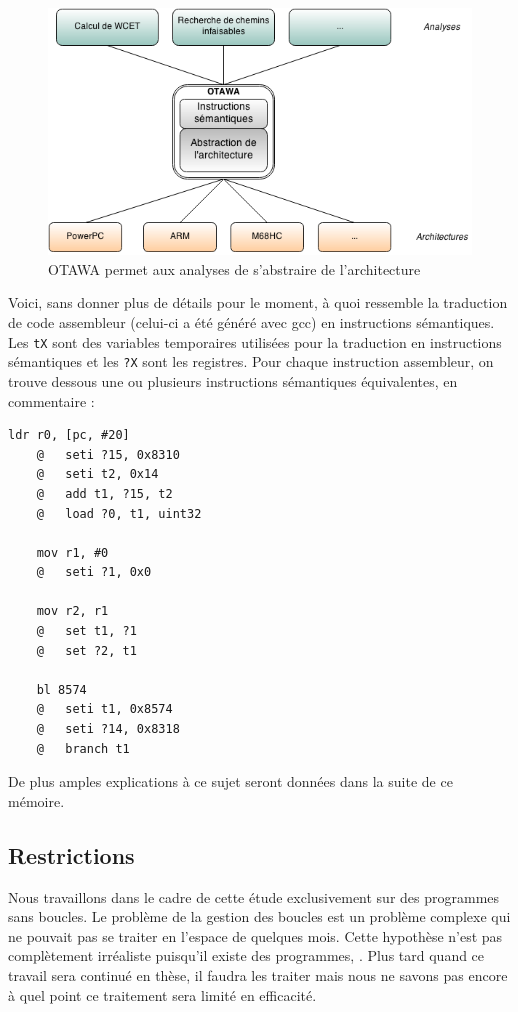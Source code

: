 \documentclass[french]{article}
\newcommand\ccc[1]{\color{red}{#1}\color{black}}
\begin{document}
  \begin{figure}
    \centering
    \includegraphics[width=\textwidth]{pictures/otawa_abstraction_architecture.png}
    \caption{OTAWA permet aux analyses de s'abstraire de l'architecture}
    \label{abstraction architecture}
  \end{figure}

  Voici, sans donner plus de détails pour le moment, à quoi ressemble la traduction de code assembleur (celui-ci a été généré avec gcc) en instructions sémantiques. Les \texttt{tX} sont des variables temporaires utilisées pour la traduction en instructions sémantiques et les \texttt{?X} sont les registres. Pour chaque instruction assembleur, on trouve dessous une ou plusieurs instructions sémantiques équivalentes, en commentaire :

  \begin{lstlisting}[language={[ARM]Assembler}]
    ldr r0, [pc, #20]
    @	seti ?15, 0x8310
    @	seti t2, 0x14
    @	add t1, ?15, t2
    @	load ?0, t1, uint32

    mov r1, #0
    @	seti ?1, 0x0

    mov r2, r1
    @	set t1, ?1
    @	set ?2, t1

    bl 8574
    @	seti t1, 0x8574
    @	seti ?14, 0x8318
    @	branch t1
  \end{lstlisting}

  De plus amples explications à ce sujet seront données dans la suite de ce mémoire.

  \subsection{Restrictions}
  Nous travaillons dans le cadre de cette étude exclusivement sur des programmes sans boucles. Le problème de la gestion des boucles est un problème complexe qui ne pouvait pas se traiter en l'espace de quelques mois. Cette hypothèse n'est pas complètement irréaliste puisqu'il existe des programmes, \ccc{ou même des langages sans boucles}. Plus tard quand ce travail sera continué en thèse, il faudra les traiter mais nous ne savons pas encore à quel point ce traitement sera limité en efficacité.
\end{document}
